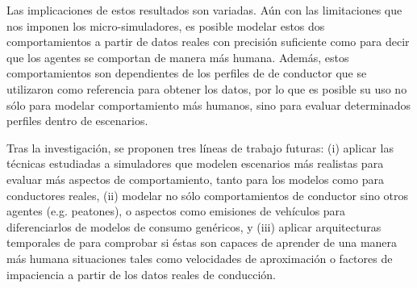 \begin{fullwidth}
	Las implicaciones de estos resultados son variadas. Aún con las limitaciones que nos imponen los micro-simuladores, es posible modelar estos dos comportamientos a partir de datos reales con precisión suficiente como para decir que los agentes se comportan de manera más humana. Además, estos comportamientos son dependientes de los perfiles de de conductor que se utilizaron como referencia para obtener los datos, por lo que es posible su uso no sólo para modelar comportamiento más humanos, sino para evaluar determinados perfiles dentro de escenarios.
	
	Tras la investigación, se proponen tres líneas de trabajo futuras: (i) aplicar las técnicas estudiadas a simuladores que modelen escenarios más realistas para evaluar más aspectos de comportamiento, tanto para los modelos como para conductores reales, (ii) modelar no sólo comportamientos de conductor sino otros agentes (e.g. peatones), o aspectos como emisiones de vehículos para diferenciarlos de modelos de consumo genéricos, y (iii) aplicar arquitecturas temporales de  para comprobar si éstas son capaces de aprender de una manera más humana situaciones tales como velocidades de aproximación o factores de impaciencia a partir de los datos reales de conducción.
\end{fullwidth}